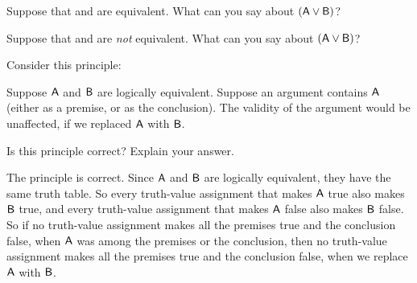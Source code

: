 \begin{small}
\begin{earg}
\item Suppose that  and  are equivalent. What can you say about $(\mathsf{A}\vee\mathsf{B})$?
\begin{ebullet}
\item[] 
\end{ebullet}

\item Suppose that  and  are \emph{not} equivalent. What can you say about $(\mathsf{A}\vee\mathsf{B})$?
\begin{ebullet}
\item[] 
\end{ebullet}

\item Consider this principle:
\begin{ebullet}
\item[] Suppose $\mathsf{A}$ and $\mathsf{B}$ are logically equivalent. Suppose an argument contains $\mathsf{A}$ (either as a premise, or as the conclusion). The validity of the argument would be unaffected, if we replaced $\mathsf{A}$ with $\mathsf{B}$.
\end{ebullet}
Is this principle correct? Explain your answer.

\begin{ebullet}
\item[] The principle is correct. Since $\mathsf{A}$ and $\mathsf{B}$ are logically equivalent, they have the same truth table. So every truth-value assignment that makes $\mathsf{A}$ true also makes $\mathsf{B}$ true, and every truth-value assignment that makes $\mathsf{A}$ false also makes $\mathsf{B}$ false. So if no truth-value assignment makes all the premises true and the conclusion false, when $\mathsf{A}$ was among the premises or the conclusion, then no truth-value assignment makes all the premises true and the conclusion false, when we replace $\mathsf{A}$ with $\mathsf{B}$.
\end{ebullet}

\end{earg}
\end{small}
